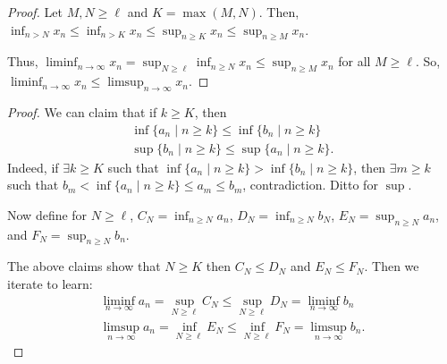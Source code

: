 \documentclass{report}
\begin{document}

\begin{proof}
    Let $M,N \geq \ell$ and $K = \max(M,N)$. Then, $\inf_{n > N} x_n \leq \inf_{n > K} x_n \leq \sup_{n \geq K} x_n \leq \sup_{n \geq M} x_n$.

    Thus, $\liminf_{n \to \infty} x_n  = \sup_{N \geq \ell} \inf_{n \geq N} x_n \leq \sup_{n \geq M} x_n$ for all $M \geq \ell$. So, $\liminf_{n \to \infty} x_n \leq \limsup_{n \to \infty} x_n$.
\end{proof}


\begin{proof}
    We can claim that if $k \geq K$, then 
    \begin{align*}
        \inf \{ a_n \mid n \geq k\} \leq \inf \{ b_n \mid n \geq k\} \\ 
        \sup \{ b_n \mid n \geq k\} \leq \sup \{ a_n \mid n \geq k\}.
    \end{align*}
    Indeed, if $\exists k \geq K$ such that $\inf \{ a_n \mid n \geq k\} > \inf \{ b_n \mid n \geq k\}$, then $\exists m \geq k$ such that $b_m < \inf\{a_n \mid n \geq k\} \leq a_m \leq b_m$, contradiction. Ditto for $\sup$. 

    Now define for $N \geq \ell$, $C_N = \inf_{n \geq N} a_n$, $D_N = \inf_{n \geq N} b_N$, $E_N = \sup_{n \geq N} a_n$, and $F_N = \sup_{n \geq N} b_n$. 

    The above claims show that $N \geq K$ then $C_N \leq D_N$ and $E_N \leq F_N$. Then we iterate to learn:
    \begin{align*}
        \liminf_{n \to \infty} a_n = \sup_{N \geq \ell} C_N \leq \sup_{N \geq \ell} D_N = \liminf_{n \to \infty} b_n \\
        \limsup_{n \to \infty} a_n = \inf_{N \geq \ell} E_N \leq \inf_{N \geq \ell} F_N = \limsup_{n \to \infty} b_n.
    \end{align*}
\end{proof}
\end{document}
